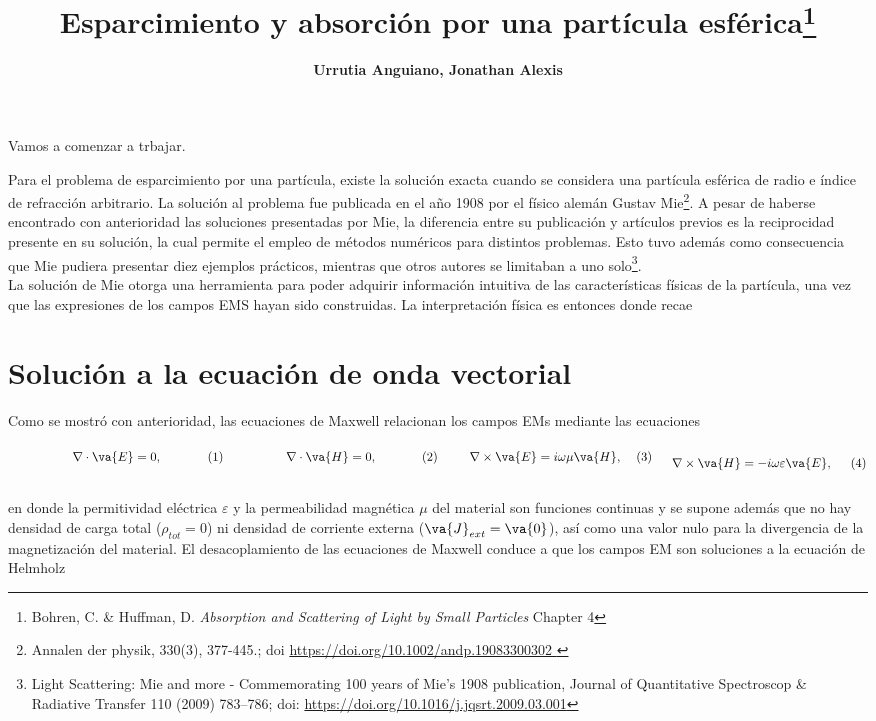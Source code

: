 \documentclass[letterpaper,11pt] {article}
\title{\Large \bf Esparcimiento y absorción por una partícula esférica\footnote{Bohren, C. \& Huffman, D. \emph{Absorption and Scattering of Light by Small Particles} Chapter 4}}
\author{\bf Urrutia Anguiano, Jonathan Alexis}
\date{}
\newcommand{\beqhalf}{\noindent \begin{minipage}[c]{.5\linewidth} \begin{equation}}
\newcommand{\eeqhalf}{\end{equation} \end{minipage} }
\newcommand{\eqhalf}[1]{\beqhalf #1 \eeqhalf}
\begin{document}
\maketitle

Vamos a comenzar a trbajar.

Para el problema de esparcimiento por una partícula, existe la solución exacta cuando se considera una partícula esférica de radio e índice de refracción arbitrario.  La solución al problema fue publicada en el año 1908 por el físico alemán Gustav Mie\footnote{Annalen der physik, 330(3), 377-445.; doi \url{https://doi.org/10.1002/andp.19083300302 }}. A pesar de haberse encontrado con anterioridad las soluciones presentadas por Mie, la diferencia entre su publicación y artículos previos es la reciprocidad presente en su solución, la cual permite el empleo de métodos numéricos para distintos problemas. Esto tuvo además como consecuencia que Mie pudiera presentar diez ejemplos  prácticos, mientras que otros autores se limitaban a uno solo\footnote{Light Scattering: Mie and more - Commemorating  100 years of Mie's 1908 publication, Journal of Quantitative Spectroscop \& Radiative Transfer 110 (2009) 783–786; doi: \url{https://doi.org/10.1016/j.jqsrt.2009.03.001}}.\\

La solución de Mie otorga una herramienta para poder adquirir información intuitiva de las características físicas de la  partícula, una vez que las expresiones de los campos EMS hayan sido construidas. La interpretación física es entonces donde recae 
 
	
	
	
	
	\section{Solución a la ecuación de onda vectorial}
	
Como se mostró con anterioridad, las ecuaciones de Maxwell relacionan los campos EMs mediante las ecuaciones\\

	\begin{subequations}
	\eqhalf{\nabla\cdot \va{E} = 0, }
	\eqhalf{\nabla\cdot \va{H} = 0,}
	\eqhalf{\nabla \times \va{E} = i\omega\mu \va{H}, }
	\eqhalf{\nabla\times\va{H} = - i \omega\varepsilon \va{E}, }	
	\label{eq:MaxwellArm}
	\end{subequations}\\
en donde la permitividad eléctrica $\varepsilon$ y la permeabilidad magnética $\mu$ del material son funciones continuas y  se supone además que no hay densidad de carga total ($\rho_{tot} =0$) ni densidad de corriente externa ($\va{J}_{ext} = \va{0}$), así como una valor nulo para la divergencia de la magnetización del material. El desacoplamiento de las ecuaciones de Maxwell conduce a que los campos EM son soluciones a la ecuación de Helmholz\\
\end{document}
